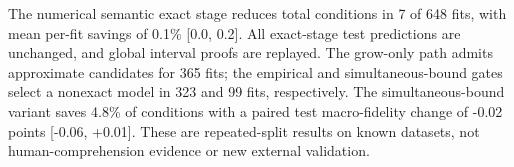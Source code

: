 The numerical semantic exact stage reduces total conditions in 7 of 648 fits, with mean per-fit savings of 0.1\% [0.0, 0.2]. All exact-stage test predictions are unchanged, and global interval proofs are replayed. The grow-only path admits approximate candidates for 365 fits; the empirical and simultaneous-bound gates select a nonexact model in 323 and 99 fits, respectively. The simultaneous-bound variant saves 4.8\% of conditions with a paired test macro-fidelity change of -0.02 points [-0.06, +0.01]. These are repeated-split results on known datasets, not human-comprehension evidence or new external validation.
